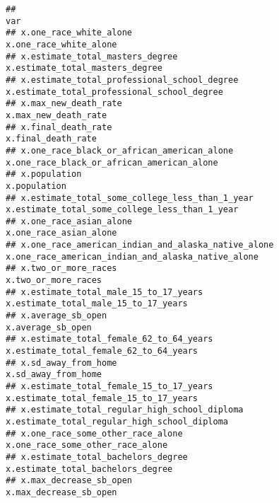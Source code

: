 \documentclass[
]{article}
\begin{document}
\begin{verbatim}
##                                                                                                                     var
## x.one_race_white_alone                                                                           x.one_race_white_alone
## x.estimate_total_masters_degree                                                         x.estimate_total_masters_degree
## x.estimate_total_professional_school_degree                                 x.estimate_total_professional_school_degree
## x.max_new_death_rate                                                                               x.max_new_death_rate
## x.final_death_rate                                                                                   x.final_death_rate
## x.one_race_black_or_african_american_alone                                   x.one_race_black_or_african_american_alone
## x.population                                                                                               x.population
## x.estimate_total_some_college_less_than_1_year                           x.estimate_total_some_college_less_than_1_year
## x.one_race_asian_alone                                                                           x.one_race_asian_alone
## x.one_race_american_indian_and_alaska_native_alone                   x.one_race_american_indian_and_alaska_native_alone
## x.two_or_more_races                                                                                 x.two_or_more_races
## x.estimate_total_male_15_to_17_years                                               x.estimate_total_male_15_to_17_years
## x.average_sb_open                                                                                     x.average_sb_open
## x.estimate_total_female_62_to_64_years                                           x.estimate_total_female_62_to_64_years
## x.sd_away_from_home                                                                                 x.sd_away_from_home
## x.estimate_total_female_15_to_17_years                                           x.estimate_total_female_15_to_17_years
## x.estimate_total_regular_high_school_diploma                               x.estimate_total_regular_high_school_diploma
## x.one_race_some_other_race_alone                                                       x.one_race_some_other_race_alone
## x.estimate_total_bachelors_degree                                                     x.estimate_total_bachelors_degree
## x.max_decrease_sb_open                                                                           x.max_decrease_sb_open

\end{verbatim}
\end{document}
